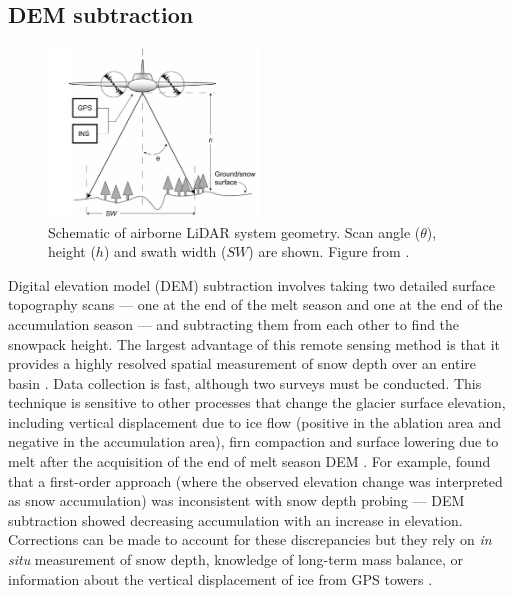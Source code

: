 \documentclass{sfuthesis}
\begin{document}
\subsection{DEM subtraction}
\begin{figure}
 \centering
      \includegraphics[width=0.5\textwidth]{lidar.png}
  \caption{Schematic of airborne LiDAR system geometry. Scan angle ($\theta$), height ($h$) and swath width ($SW$) are shown. Figure from \cite{Deems2006}.}
        \label{lidar}
\end{figure}

Digital elevation model (DEM) subtraction involves taking two detailed surface topography scans --- one at the end of the melt season and one at the end of the accumulation season --- and subtracting them from each other to find the snowpack height. The largest advantage of this remote sensing method is that it provides a highly resolved spatial measurement of snow depth over an entire basin \citep{Deems2006, Sold2013}. Data collection is fast, although two surveys must be conducted. This technique is sensitive to other processes that change the glacier surface elevation, including vertical displacement due to ice flow (positive in the ablation area and negative in the accumulation area), firn compaction and surface lowering due to melt after the acquisition of the end of melt season DEM \citep{Sold2013}. For example, \citep{Sold2013} found that a first-order approach (where the observed elevation change was interpreted as snow accumulation) was inconsistent with snow depth probing --- DEM subtraction showed decreasing accumulation with an increase in elevation. Corrections can be made to account for these discrepancies but they rely on \textit{in situ} measurement of snow depth, knowledge of long-term mass balance, or information about the vertical displacement of ice from GPS towers \citep{Sold2013}. 
\end{document}

